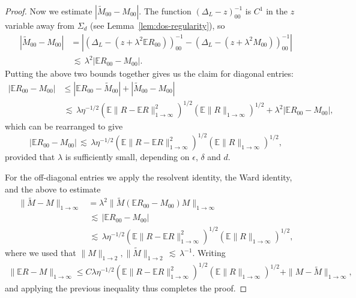 \documentclass[10pt,a4paper]{amsart}
\def\Expec{{\mathbb E}}
\def\lsim{{\,\lesssim\,}}
\begin{document}
\begin{proof}
Now we estimate $|\tilde{M}_{00} - M_{00}|$. The function $(\Delta_{L}-z)^{-1}_{00}$ is  $C^1$ in the $z$ variable away from $\Sigma_d$
(see Lemma~\ref{lem:dos-regularity}), so
\begin{align*}
    |\tilde{M}_{00} - M_{00}|
&= |(\Delta_{L} - (z+\lambda^2\Expec R_{00}))^{-1}_{00}
- (\Delta_L - (z+\lambda^2 M_{00}))^{-1}_{00}| \\
&\lsim \lambda^2 |\Expec R_{00} - M_{00}|.
\end{align*}
Putting the above two bounds together gives us the claim for diagonal entries:
\begin{align*}
|\Expec  R_{00} - M_{00}|
&\leq |\Expec R_{00} - \tilde{M}_{00}| + |\tilde{M}_{00}-M_{00}| \\
&\lsim \lambda\eta^{-1 / 2} \left(  \Expec \|R-\Expec R\|_{1\to \infty}^{2}\right) ^{1/ 2}
\left( \Expec\|R\|_{1\to \infty} \right)^{1 /2}
 + \lambda^2 |\Expec R_{00} - M_{00}|,
\end{align*}
which can be rearranged to give
\[
|\Expec R_{00} - M_{00}| \lsim
\lambda\eta^{-1 / 2} \left(  \Expec \|R-\Expec R\|_{1\to \infty}^{2}\right) ^{1/ 2}
\left( \Expec\|R\|_{1\to \infty} \right)^{1 /2},
\]
provided that $\lambda$ is sufficiently small, depending on $\epsilon$, $\delta$ and $d$.

For the off-diagonal entries we apply the resolvent identity, the Ward identity,
and the above to estimate
\begin{align*}
\|\tilde{M}-M\|_{1\to\infty}
& =\lambda^{2}\|\tilde{M}(\Expec R_{00}-M_{00})M\|_{1\to\infty}\\
& \lsim |\mathbb{E}R_{00}-M_{00}|\\
& \lsim \lambda\eta^{-1 / 2} \left(  \Expec \|R-\Expec R\|_{1\to \infty}^{2}\right) ^{1/ 2}
\left( \Expec\|R\|_{1\to \infty} \right)^{1 /2},
\end{align*}
where we used that $\|M\|_{1\to 2}, \|\tilde{M}\|_{1\to 2}\lsim \lambda^{-1}.$
Writing
\begin{align*}
\|\Expec R-M\|_{1\to \infty}\leq C\lambda\eta^{-1 / 2}
\left(  \Expec \|R-\Expec R\|_{1\to \infty}^{2}\right) ^{1/ 2}
\left( \Expec\|R\|_{1\to \infty} \right)^{1 /2}
+\|M-\tilde{M}\|_{1\to \infty},
\end{align*}
and applying the previous inequality thus completes the proof.
\end{proof}
\end{document}
